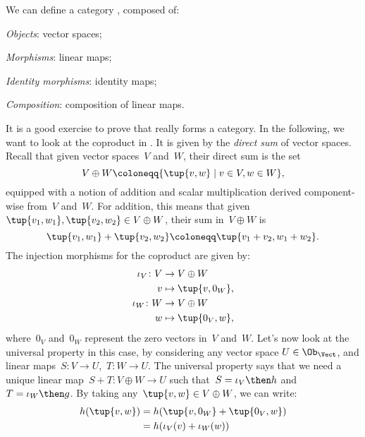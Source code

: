 \begin{example}
  We can define a category \iindex{\Vect}, composed of:
  \begin{compactitem}
    \item \emph{Objects}: vector spaces;
    \item \emph{Morphisms}: linear maps;
    \item \emph{Identity morphisms}: identity maps;
    \item \emph{Composition}: composition of linear maps.
  \end{compactitem}
  It is a good exercise to prove that \Vect really forms a category. In the following, we want to look at the coproduct in \Vect. It is given by the \emph{direct sum} of vector spaces. Recall that given vector spaces~$V$ and~$W$, their direct sum is the set
  \begin{equation*}
    V\oplus W\coloneqq \{\tup{v,w}\mid v\in V,w\in W\},
  \end{equation*}
  equipped with a notion of addition and scalar multiplication derived component-wise from~$V$ and~$W$. For addition, this means that given~$\tup{v_1,w_1},\tup{v_2,w_2}\in V\oplus W$, their sum in~$V \oplus W$ is
  \begin{equation*}
    \tup{v_1,w_1}+\tup{v_2,w_2}\coloneqq \tup{v_1+v_2,w_1+w_2}.
  \end{equation*}
  The injection morphisms for the coproduct are given by:
  \begin{equation*}
    \begin{aligned}
      \iota_V\colon V&\to V\oplus W\\
      v&\mapsto \tup{v,0_W},\\
      \iota_W\colon W&\to V\oplus W\\
      w&\mapsto \tup{0_V,w},
    \end{aligned}
  \end{equation*}
  where~$0_V$ and~$0_W$ represent the zero vectors in~$V$ and~$W$. Let's now look at the universal property in this case, by considering any vector space $U\in \Ob_\Vect$, and linear maps~$S\colon V\to U$,~$T\colon W\to U$. The universal property says that we need a unique linear map~$S+T\colon V\oplus W \to U$ such that~$S=\iota_V\then h$ and~$T=\iota_W\then g$. By taking any~$\tup{v,w}\in V\oplus W$, we can write:
  \begin{equation*}
    \begin{aligned}
      h(\tup{v,w})&=h(\tup{v,0_W}+\tup{0_V,w})\\
      &=h(\iota_V(v)+\iota_W(w)) \\

\end{aligned}
\end{equation*}
\end{example}
